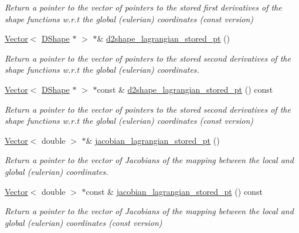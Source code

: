 \begin{DoxyCompactItemize}
\begin{DoxyCompactList}\small\item\em Return a pointer to the vector of pointers to the stored first derivatives of the shape functions w.\+r.\+t the global (eulerian) coordinates (const version) \end{DoxyCompactList}\item 
\hyperlink{classoomph_1_1Vector}{Vector}$<$ \hyperlink{classoomph_1_1DShape}{D\+Shape} $\ast$ $>$ $\ast$\& \hyperlink{classoomph_1_1StorableShapeSolidElementBase_a7b8adfda8200cdd3a7ecbb7d01c14605}{d2shape\+\_\+lagrangian\+\_\+stored\+\_\+pt} ()
\begin{DoxyCompactList}\small\item\em Return a pointer to the vector of pointers to the stored second derivatives of the shape functions w.\+r.\+t the global (eulerian) coordinates. \end{DoxyCompactList}\item 
\hyperlink{classoomph_1_1Vector}{Vector}$<$ \hyperlink{classoomph_1_1DShape}{D\+Shape} $\ast$ $>$ $\ast$const  \& \hyperlink{classoomph_1_1StorableShapeSolidElementBase_a3a6c1f65abc9dca34fa0cd4e88b888cb}{d2shape\+\_\+lagrangian\+\_\+stored\+\_\+pt} () const
\begin{DoxyCompactList}\small\item\em Return a pointer to the vector of pointers to the stored second derivatives of the shape functions w.\+r.\+t the global (eulerian) coordinates (const version) \end{DoxyCompactList}\item 
\hyperlink{classoomph_1_1Vector}{Vector}$<$ double $>$ $\ast$\& \hyperlink{classoomph_1_1StorableShapeSolidElementBase_a7a852f45981f5406f6e2f49a2f9c8fc2}{jacobian\+\_\+lagrangian\+\_\+stored\+\_\+pt} ()
\begin{DoxyCompactList}\small\item\em Return a pointer to the vector of Jacobians of the mapping between the local and global (eulerian) coordinates. \end{DoxyCompactList}\item 
\hyperlink{classoomph_1_1Vector}{Vector}$<$ double $>$ $\ast$const  \& \hyperlink{classoomph_1_1StorableShapeSolidElementBase_a8b69f236c0b5ecdf488399a4230c98ec}{jacobian\+\_\+lagrangian\+\_\+stored\+\_\+pt} () const
\begin{DoxyCompactList}\small\item\em Return a pointer to the vector of Jacobians of the mapping between the local and global (eulerian) coordinates (const version) \end{DoxyCompactList}\item 

\end{DoxyCompactItemize}

